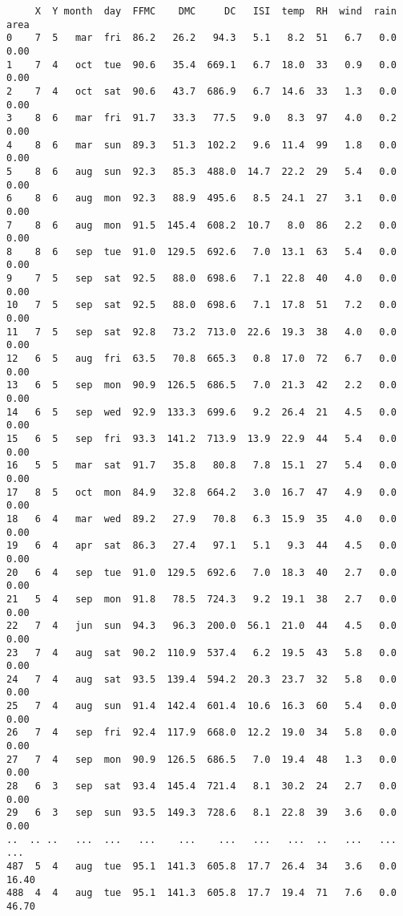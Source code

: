 \documentclass[landscape, a4paper, 10pt]{article}
\begin{document}
    
    \begin{verbatim}
     X  Y month  day  FFMC    DMC     DC   ISI  temp  RH  wind  rain   area
0    7  5   mar  fri  86.2   26.2   94.3   5.1   8.2  51   6.7   0.0   0.00
1    7  4   oct  tue  90.6   35.4  669.1   6.7  18.0  33   0.9   0.0   0.00
2    7  4   oct  sat  90.6   43.7  686.9   6.7  14.6  33   1.3   0.0   0.00
3    8  6   mar  fri  91.7   33.3   77.5   9.0   8.3  97   4.0   0.2   0.00
4    8  6   mar  sun  89.3   51.3  102.2   9.6  11.4  99   1.8   0.0   0.00
5    8  6   aug  sun  92.3   85.3  488.0  14.7  22.2  29   5.4   0.0   0.00
6    8  6   aug  mon  92.3   88.9  495.6   8.5  24.1  27   3.1   0.0   0.00
7    8  6   aug  mon  91.5  145.4  608.2  10.7   8.0  86   2.2   0.0   0.00
8    8  6   sep  tue  91.0  129.5  692.6   7.0  13.1  63   5.4   0.0   0.00
9    7  5   sep  sat  92.5   88.0  698.6   7.1  22.8  40   4.0   0.0   0.00
10   7  5   sep  sat  92.5   88.0  698.6   7.1  17.8  51   7.2   0.0   0.00
11   7  5   sep  sat  92.8   73.2  713.0  22.6  19.3  38   4.0   0.0   0.00
12   6  5   aug  fri  63.5   70.8  665.3   0.8  17.0  72   6.7   0.0   0.00
13   6  5   sep  mon  90.9  126.5  686.5   7.0  21.3  42   2.2   0.0   0.00
14   6  5   sep  wed  92.9  133.3  699.6   9.2  26.4  21   4.5   0.0   0.00
15   6  5   sep  fri  93.3  141.2  713.9  13.9  22.9  44   5.4   0.0   0.00
16   5  5   mar  sat  91.7   35.8   80.8   7.8  15.1  27   5.4   0.0   0.00
17   8  5   oct  mon  84.9   32.8  664.2   3.0  16.7  47   4.9   0.0   0.00
18   6  4   mar  wed  89.2   27.9   70.8   6.3  15.9  35   4.0   0.0   0.00
19   6  4   apr  sat  86.3   27.4   97.1   5.1   9.3  44   4.5   0.0   0.00
20   6  4   sep  tue  91.0  129.5  692.6   7.0  18.3  40   2.7   0.0   0.00
21   5  4   sep  mon  91.8   78.5  724.3   9.2  19.1  38   2.7   0.0   0.00
22   7  4   jun  sun  94.3   96.3  200.0  56.1  21.0  44   4.5   0.0   0.00
23   7  4   aug  sat  90.2  110.9  537.4   6.2  19.5  43   5.8   0.0   0.00
24   7  4   aug  sat  93.5  139.4  594.2  20.3  23.7  32   5.8   0.0   0.00
25   7  4   aug  sun  91.4  142.4  601.4  10.6  16.3  60   5.4   0.0   0.00
26   7  4   sep  fri  92.4  117.9  668.0  12.2  19.0  34   5.8   0.0   0.00
27   7  4   sep  mon  90.9  126.5  686.5   7.0  19.4  48   1.3   0.0   0.00
28   6  3   sep  sat  93.4  145.4  721.4   8.1  30.2  24   2.7   0.0   0.00
29   6  3   sep  sun  93.5  149.3  728.6   8.1  22.8  39   3.6   0.0   0.00
..  .. ..   ...  ...   ...    ...    ...   ...   ...  ..   ...   ...    ...
487  5  4   aug  tue  95.1  141.3  605.8  17.7  26.4  34   3.6   0.0  16.40
488  4  4   aug  tue  95.1  141.3  605.8  17.7  19.4  71   7.6   0.0  46.70

\end{verbatim}
\end{document}
